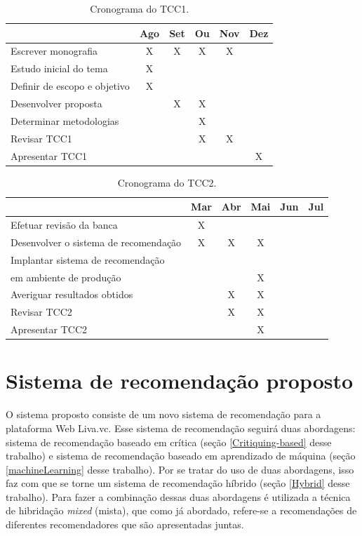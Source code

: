 \begin{table}[H]
\centering
\caption[Cronograma do TCC1]{Cronograma do TCC1.}
\label{tab:cronograma_tcc1}
\begin{tabular}{lccccc}
\hline
\textbf{} & \textbf{Ago} & \textbf{Set} & \textbf{Ou} & \textbf{Nov} & \textbf{Dez} \\ \hline
Escrever monografia & X & X & X & X &  \\ \hline
Estudo inicial do tema & X &  &  &  &  \\ \hline
Definir de escopo e objetivo & X &  &  &  &  \\ \hline
Desenvolver proposta &  & X & X &  &  \\ \hline
Determinar metodologias &  &  & X &  &  \\ \hline
Revisar TCC1 &  &  & X & X &  \\ \hline
Apresentar TCC1 &  &  &  &  & X \\ \hline
\end{tabular}
\end{table}

\begin{table}[H]
\centering
\caption[Cronograma do TCC2]{Cronograma do TCC2.}
\label{tab:cronograma_tcc2}
\begin{tabular}{lccccc}
\hline
\textbf{} & \textbf{Mar} & \textbf{Abr} & \textbf{Mai} & \textbf{Jun} & \textbf{Jul} \\ \hline
Efetuar revisão da banca & X &  &  &  &  \\ \hline
Desenvolver o sistema de recomendação & X & X & X &  &  \\ \hline
Implantar sistema de recomendação \\ em ambiente de produção &  &  & X &  &  \\ \hline
Averiguar resultados obtidos &  & X & X &  & \\ \hline
Revisar TCC2 &  & X & X &  & \\ \hline
Apresentar TCC2 &  &  & X &  & \\ \hline
\end{tabular}
\end{table}

\section{Sistema de recomendação proposto}
\label{section_sr}

O sistema proposto consiste de um novo sistema de recomendação para a plataforma Web Liva.vc. Esse sistema de recomendação seguirá duas abordagens: sistema de recomendação baseado em crítica (seção \ref{Critiquing-based} desse trabalho) e sistema de recomendação baseado em aprendizado de máquina (seção \ref{machineLearning} desse trabalho). Por se tratar do uso de duas abordagens, isso faz com que se torne um sistema de recomendação híbrido (seção \ref{Hybrid} desse trabalho). Para fazer a combinação dessas duas abordagens é utilizada a técnica de hibridação \textit{mixed} (mista), que como já abordado, refere-se a recomendações de diferentes recomendadores que são apresentadas juntas.

